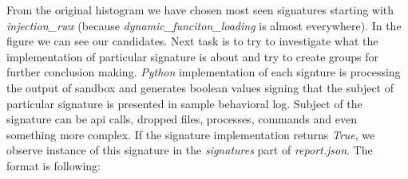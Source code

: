 From the original histogram we have chosen most seen signatures starting with \emph{injection_rwx} (because \emph{dynamic_funciton_loading} is almost everywhere). In the figure  we can see our candidates. 
Next task is to try to investigate what the implementation of particular signature is about and try to create groups for further conclusion making. \emph{Python} implementation of each signture is processing the output of sandbox and generates boolean values signing that the subject of particular signature is presented in sample behavioral log. Subject of the signature can be api calls, dropped files, processes, commands and even something more complex. If the signature implementation returns \emph{True}, we observe instance of this signature in the \emph{signatures} part of \emph{report.json}. The format is following: 

